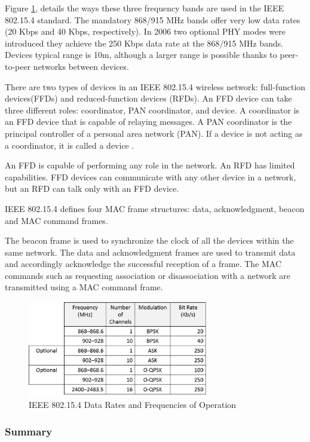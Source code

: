 Figure \ref{fig:802.15.4}, details the ways these three frequency bands are used in the IEEE 802.15.4 standard.
The mandatory 868/915 MHz bands offer very low data rates (20 Kbps and 40 Kbps, respectively). In 2006 two optional PHY modes were introduced they achieve the 250 Kbps data rate at the 868/915 MHz bands.
Devices typical range is 10m, although a larger range is possible thanks to peer-to-peer networks between devices.

There are two types of devices in an IEEE 802.15.4 wireless network: full-function devices(FFDs) and reduced-function devices (RFDs). An FFD device can take three different roles: coordinator, PAN coordinator, and device. A coordinator is an FFD device that is capable of relaying messages. A PAN coordinator is the principal controller of a personal area network
(PAN). If a device is not acting as a coordinator, it is called a device .

An FFD is capable of performing any role in the network. An RFD has limited capabilities. FFD devices can communicate with any other device in a network, but an RFD can talk only with an FFD device. 


IEEE 802.15.4 defines four MAC frame structures: data, acknowledgment, beacon and MAC command frames.

The beacon frame is used to synchronize the clock of all the devices within the same network. The data and acknowledgment frames are used to transmit data and accordingly acknowledge the successful reception of a frame. The MAC commands such as requesting association or disassociation with a network are transmitted using a MAC command frame.



\begin{figure}[h]
\centering
\includegraphics[width=0.7\textwidth]{Figures/802_15_4}
\caption{IEEE 802.15.4 Data Rates and Frequencies of Operation}
\label{fig:802.15.4}
\end{figure}


\subsubsection{Summary}\mbox{}\\

